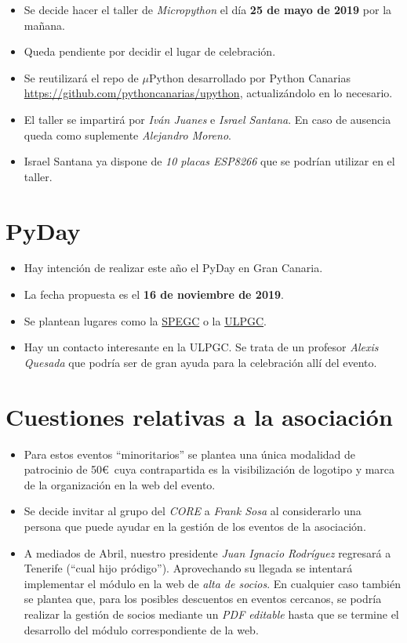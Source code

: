 \documentclass[a4paper, 12pt]{article}
\begin{document}
\begin{itemize}
    \item Se decide hacer el taller de \textit{Micropython} el día \textbf{25 de mayo de 2019} por la mañana.
    \item Queda pendiente por decidir el lugar de celebración.
    \item Se reutilizará el repo de $\mu$Python desarrollado por Python Canarias \url{https://github.com/pythoncanarias/upython}, actualizándolo en lo necesario.
    \item El taller se impartirá por \textit{Iván Juanes} e \textit{Israel Santana}. En caso de ausencia queda como suplemente \textit{Alejandro Moreno}.
    \item Israel Santana ya dispone de \textit{10 placas ESP8266} que se podrían utilizar en el taller.
\end{itemize}

\section{PyDay}

\begin{itemize}
    \item Hay intención de realizar este año el PyDay en Gran Canaria.
    \item La fecha propuesta es el \textbf{16 de noviembre de 2019}.
    \item Se plantean lugares como la \href{https://www.spegc.org/}{SPEGC} o la \href{https://www.ulpgc.es}{ULPGC}.
    \item Hay un contacto interesante en la ULPGC. Se trata de un profesor \textit{Alexis Quesada} que podría ser de gran ayuda para la celebración allí del evento.
\end{itemize}

\section{Cuestiones relativas a la asociación}

\begin{itemize}
    \item Para estos eventos ``minoritarios'' se plantea una única modalidad de patrocinio de 50\euro\ cuya contrapartida es la visibilización de logotipo y marca de la organización en la web del evento.
    \item Se decide invitar al grupo del \textit{CORE} a \textit{Frank Sosa} al considerarlo una persona que puede ayudar en la gestión de los eventos de la asociación.
    \item A mediados de Abril, nuestro presidente \textit{Juan Ignacio Rodríguez} regresará a Tenerife (``cual hijo pródigo''). Aprovechando su llegada se intentará implementar el módulo en la web de \textit{alta de socios}. En cualquier caso también se plantea que, para los posibles descuentos en eventos cercanos, se podría realizar la gestión de socios mediante un \textit{PDF editable} hasta que se termine el desarrollo del módulo correspondiente de la web.
\end{itemize}
\end{document}

